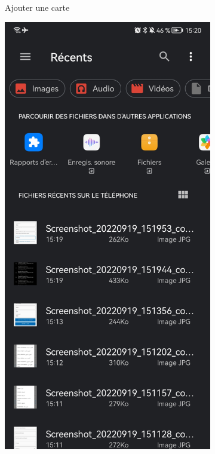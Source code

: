 \begin{figure}
\begin{subfigure}[b]{0.3\textwidth}
			\caption{Ajouter une carte}
			\label{fig:three sin x}
		\end{subfigure}
		\hfill
		\begin{subfigure}[b]{0.3\textwidth}
			\centering
			\includegraphics[width=\textwidth]{./Template LaTeX/Images/8.jpg}

\end{subfigure}
\end{figure}
